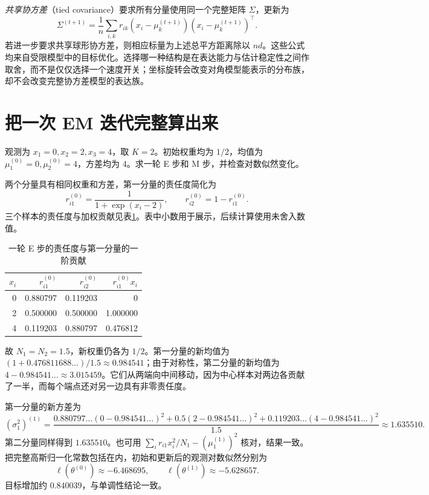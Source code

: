 \documentclass[UTF8,12pt,a4paper,fontset=fandol]{ctexart}
\begin{document}
\emph{共享协方差}（tied covariance）要求所有分量使用同一个完整矩阵 $\Sigma$，更新为
\begin{equation}
\Sigma^{(t+1)}=\frac1n\sum_{i,k}r_{ik}
(x_i-\mu_k^{(t+1)})(x_i-\mu_k^{(t+1)})^\top.
\label{eq:gmm-tied-update}
\end{equation}
若进一步要求共享球形协方差，则相应标量为上述总平方距离除以 $nd$。这些公式均来自受限模型中的目标优化。选择哪一种结构是在表达能力与估计稳定性之间作取舍，而不是仅仅选择一个速度开关；坐标旋转会改变对角模型能表示的分布族，却不会改变完整协方差模型的表达族。

\section{把一次 EM 迭代完整算出来}
\label{sec:gmm-numerical-example}

\begin{example}
观测为 $x_1=0,x_2=2,x_3=4$，取 $K=2$。初始权重均为 $1/2$，均值为 $\mu_1^{(0)}=0,\mu_2^{(0)}=4$，方差均为 $4$。求一轮 E 步和 M 步，并检查对数似然变化。
\end{example}
\begin{solve}
两个分量具有相同权重和方差，第一分量的责任度简化为
\[
r_{i1}^{(0)}=\frac{1}{1+\exp(x_i-2)},\qquad r_{i2}^{(0)}=1-r_{i1}^{(0)}.
\]
三个样本的责任度与加权贡献见表\ref{tab:gmm-example}。表中小数用于展示，后续计算使用未舍入数值。
\begin{table}[htbp]
\centering
\caption{一轮 E 步的责任度与第一分量的一阶贡献}
\label{tab:gmm-example}
\begin{tabular}{rrrr}
\toprule
$x_i$ & $r_{i1}^{(0)}$ & $r_{i2}^{(0)}$ & $r_{i1}^{(0)}x_i$\\
\midrule
0 & 0.880797 & 0.119203 & 0\\
2 & 0.500000 & 0.500000 & 1.000000\\
4 & 0.119203 & 0.880797 & 0.476812\\
\bottomrule
\end{tabular}
\end{table}
故 $N_1=N_2=1.5$，新权重仍各为 $1/2$。第一分量的新均值为 $(1+0.476811688\ldots)/1.5\approx0.984541$；由于对称性，第二分量的新均值为 $4-0.984541\ldots\approx3.015459$。它们从两端向中间移动，因为中心样本对两边各贡献了一半，而每个端点还对另一边具有非零责任度。

第一分量的新方差为
\[
(\sigma_1^2)^{(1)}=
\frac{0.880797\ldots(0-0.984541\ldots)^2
+0.5(2-0.984541\ldots)^2
+0.119203\ldots(4-0.984541\ldots)^2}{1.5}
\approx1.635510.
\]
第二分量同样得到 $1.635510$。也可用 $\sum_i r_{i1}x_i^2/N_1-(\mu_1^{(1)})^2$ 核对，结果一致。把完整高斯归一化常数包括在内，初始和更新后的观测对数似然分别为
\[
\ell(\theta^{(0)})\approx-6.468695,
\qquad \ell(\theta^{(1)})\approx-5.628657.
\]
目标增加约 $0.840039$，与单调性结论一致。
\end{solve}
\end{document}
